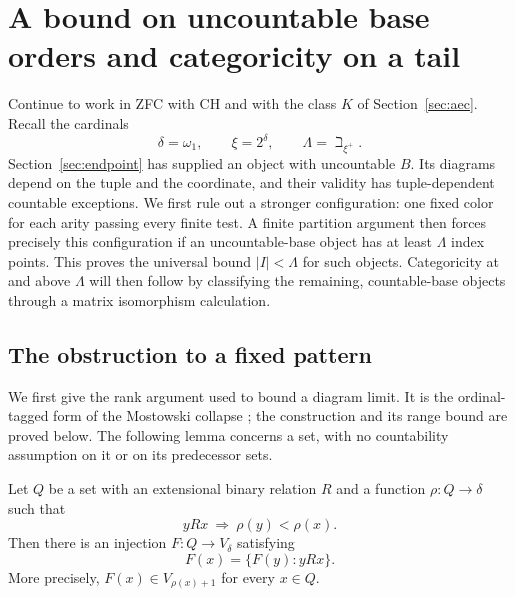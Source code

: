 \section{A bound on uncountable base orders and categoricity on a tail}
\label{sec:categoricity}

Continue to work in ZFC with CH and with the class $K$ of
Section~\ref{sec:aec}. Recall the cardinals
\[
 \delta=\omega_1,\qquad \xi=2^\delta,
 \qquad \Lambda=\beth_{\xi^+}.
\]
Section~\ref{sec:endpoint} has supplied an object with uncountable $B$.
Its diagrams depend on the tuple and the coordinate, and their validity
has tuple-dependent countable exceptions. We first rule out a stronger
configuration: one fixed color for each arity passing every finite test.
A finite partition argument then forces precisely this configuration
if an uncountable-base object has at least $\Lambda$ index points.
This proves the universal bound $|I|<\Lambda$ for such objects.
Categoricity at and above $\Lambda$ will then follow by classifying the
remaining, countable-base objects through a matrix isomorphism calculation.

\subsection{The obstruction to a fixed pattern}

We first give the rank argument used to bound a diagram limit.
It is the ordinal-tagged form of the Mostowski collapse
\cite{Mostowski1949}; the construction and its range bound are proved
below. The following lemma concerns a set, with no countability
assumption on it or on its predecessor sets.

\begin{lemma}\label{col:collapse}
Let \(Q\) be a set with an extensional binary relation \(R\) and
a function \(\rho:Q\to\delta\) such that
\[
                   yRx\ \Longrightarrow\ \rho(y)<\rho(x).
\]
Then there is an injection \(F:Q\to V_\delta\) satisfying
\[
                         F(x)=\{F(y):yRx\}.
\]
More precisely, \(F(x)\in V_{\rho(x)+1}\) for every \(x\in Q\).
\end{lemma}

